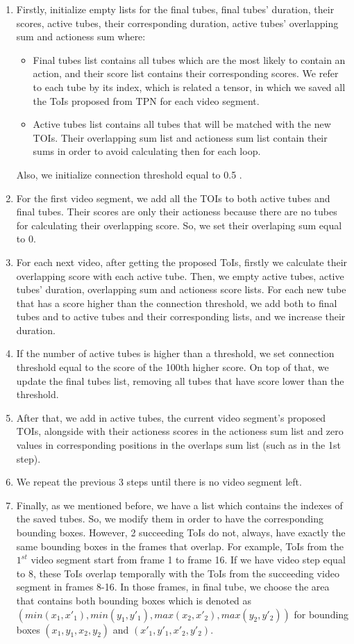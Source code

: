 \begin{enumerate}
\item Firstly,  initialize empty lists for the final tubes, final tubes' duration, their scores, active tubes, their corresponding duration,
  active tubes' overlapping sum and actioness sum where:
  \begin{itemize}
  \item Final tubes list contains all tubes which are the most likely to contain an action, and their score list contains their
    corresponding scores. We refer to each tube by its index, which is related a tensor, in which we saved all the ToIs proposed
    from TPN for each video segment.
  \item Active tubes list contains all tubes that will be matched with the new TOIs. Their overlapping sum list and actioness sum list
    contain their sums in order to avoid calculating then for each loop. 
  \end{itemize}
Also, we initialize  connection threshold equal to 0.5 .
\item For the first video segment, we add all the TOIs to both active tubes and final tubes. Their scores are only their actioness because
  there are no tubes for calculating their overlapping score. So, we set their overlaping sum equal to 0.
\item For each next video, after getting the proposed ToIs, firstly we calculate their overlapping score with each active tube. Then, we
  empty active tubes, active tubes' duration, overlapping sum and actioness score lists.  For each new tube that has a score higher than the
  connection threshold,  we add both to final tubes and to active tubes and their corresponding lists, and we increase their duration.
\item If the number of active tubes is higher than a threshold, we set connection threshold equal to the score of
  the 100th higher score. On top of that, we update the final tubes list, removing all tubes that have score lower than the threshold.
\item After that, we add in active tubes, the current video segment's proposed TOIs, alongside with their actioness scores in the  actioness sum list and
  zero values in corresponding positions in the overlaps sum list (such as in the 1st step).
\item We repeat the previous 3 steps until there is no video segment left.
\item Finally, as we mentioned before, we have a list which contains the indexes of the saved tubes. So, we modify them in order to have
  the corresponding bounding boxes. However, 2 succeeding ToIs do not, always, have exactly the same bounding boxes in the frames that overlap. For example,
  ToIs from the $1^{st}$ video segment start from frame 1 to frame 16. If we have video step equal to 8, these ToIs overlap temporally
  with the ToIs from the  succeeding video segment in frames 8-16. In those frames, in final tube, we choose the area that contains both bounding boxes which is
  denoted as $(min(x_1,x'_1), min(y_1,y'_1), max(x_2,x'_2), max(y_2,y'_2))$ for bounding boxes $(x_1,y_1,x_2,y_2)$ and $(x'_1,y'_1,x'_2,y'_2)$.
\end{enumerate}

